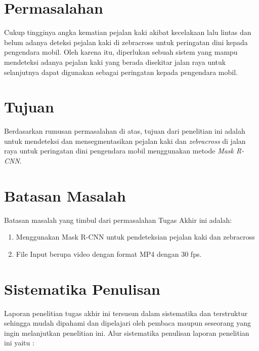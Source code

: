 \section{Permasalahan}
\label{sec:permasalahan}

Cukup tingginya angka kematian pejalan kaki akibat kecelakaan lalu lintas dan belum adanya deteksi pejalan kaki di zebracross untuk peringatan dini kepada pengendara mobil. Oleh karena itu, diperlukan sebuah sistem yang mampu mendeteksi adanya pejalan kaki yang berada disekitar jalan raya untuk selanjutnya dapat digunakan sebagai peringatan kepada pengendara mobil.

\section{Tujuan}
\label{sec:Tujuan}

Berdasarkan rumusan permasalahan di atas, tujuan dari penelitian ini adalah untuk mendeteksi dan mensegmentasikan pejalan kaki dan \textit{zebracross} di jalan raya untuk peringatan dini pengendara mobil menggunakan metode \textit{Mask R-CNN}.



\section{Batasan Masalah}
\label{sec:batasanmasalah}

Batasan masalah yang timbul dari permasalahan Tugas Akhir ini adalah:

\begin{enumerate}[nolistsep]

  \item Menggunakan Mask R-CNN untuk pendeteksian pejalan kaki dan zebracross
  \item File Input berupa video dengan format MP4 dengan 30 fps. 

\end{enumerate}

\section{Sistematika Penulisan}
\label{sec:sistematikapenulisan}

Laporan penelitian tugas akhir ini tersusun dalam sistematika dan terstruktur sehingga mudah dipahami dan dipelajari oleh pembaca maupun seseorang yang ingin melanjutkan penelitian ini. Alur sistematika penulisan laporan penelitian ini yaitu :

